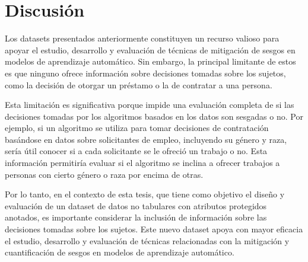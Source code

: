 \section{Discusi\'on}

Los datasets presentados anteriormente constituyen un recurso valioso para apoyar el estudio, desarrollo y evaluaci\'on de t\'ecnicas de 
mitigaci\'on de sesgos en modelos de aprendizaje autom\'atico. Sin embargo, la principal limitante de estos es que ninguno ofrece 
informaci\'on sobre decisiones tomadas sobre los sujetos, como la decisi\'on de otorgar un pr\'estamo o la de contratar a una persona.

Esta limitaci\'on es significativa porque impide una evaluaci\'on completa de si las decisiones tomadas por los algoritmos basados 
en los datos son sesgadas o no. Por ejemplo, si un algoritmo se utiliza para tomar decisiones de contrataci\'on bas\'andose en datos
sobre solicitantes de empleo, incluyendo su g\'enero y raza, ser\'ia \'util conocer si a cada solicitante se le ofreci\'o 
un trabajo o no. Esta informaci\'on permitir\'ia evaluar si el algoritmo se inclina a ofrecer trabajos a personas con cierto g\'enero o raza
por encima de otras.

Por lo tanto, en el contexto de esta tesis, que tiene como objetivo el dise\~no y evaluaci\'on de un dataset de datos no tabulares
con atributos protegidos anotados, es importante considerar la inclusi\'on de informaci\'on sobre las decisiones tomadas sobre los sujetos.
Este nuevo dataset apoya con mayor eficacia el estudio, desarrollo y evaluaci\'on de t\'ecnicas relacionadas con la mitigaci\'on y 
cuantificaci\'on de sesgos en modelos de aprendizaje autom\'atico.

